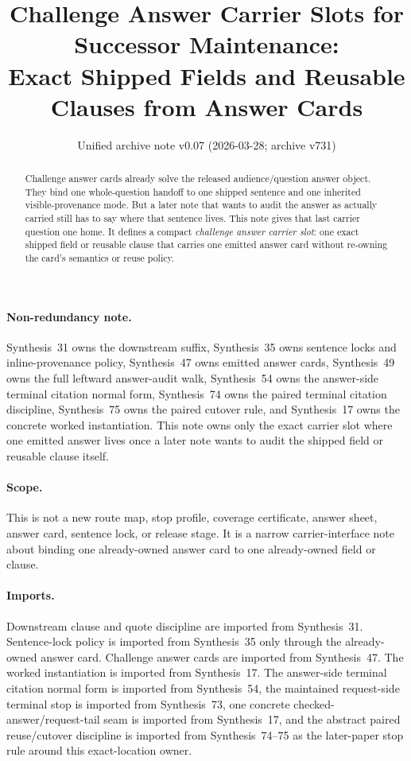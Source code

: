 \documentclass[11pt]{article}
\title{Challenge Answer Carrier Slots for Successor Maintenance:\\[0.5ex]
\large Exact Shipped Fields and Reusable Clauses from Answer Cards}
\author{}
\date{Unified archive note v0.07 (2026-03-28; archive v731)}
\begin{document}
\maketitle

\begin{abstract}
Challenge answer cards already solve the released audience/question answer object.
They bind one whole-question handoff to one shipped sentence and one inherited visible-provenance mode.
But a later note that wants to audit the answer as actually carried still has to say where that sentence lives.
This note gives that last carrier question one home.
It defines a compact \emph{challenge answer carrier slot}: one exact shipped field or reusable clause that carries one emitted answer card without re-owning the card's semantics or reuse policy.
\end{abstract}

\paragraph{Non-redundancy note.}
Synthesis~31 owns the downstream suffix, Synthesis~35 owns sentence locks and inline-provenance policy, Synthesis~47 owns emitted answer cards, Synthesis~49 owns the full leftward answer-audit walk, Synthesis~54 owns the answer-side terminal citation normal form, Synthesis~74 owns the paired terminal citation discipline, Synthesis~75 owns the paired cutover rule, and Synthesis~17 owns the concrete worked instantiation.
This note owns only the exact carrier slot where one emitted answer lives once a later note wants to audit the shipped field or reusable clause itself.

\paragraph{Scope.}
This is not a new route map, stop profile, coverage certificate, answer sheet, answer card, sentence lock, or release stage.
It is a narrow carrier-interface note about binding one already-owned answer card to one already-owned field or clause.

\paragraph{Imports.}
Downstream clause and quote discipline are imported from Synthesis~31.\cite{series:downstreamnormalforms}
Sentence-lock policy is imported from Synthesis~35 only through the already-owned answer card.\cite{series:sentencelocks}
Challenge answer cards are imported from Synthesis~47.\cite{series:challengeanswercards}
The worked instantiation is imported from Synthesis~17.\cite{series:workedexample}
The answer-side terminal citation normal form is imported from Synthesis~54, the maintained request-side terminal stop is imported from Synthesis~73, one concrete checked-answer/request-tail seam is imported from Synthesis~17, and the abstract paired reuse/cutover discipline is imported from Synthesis~74--75 as the later-paper stop rule around this exact-location owner.\cite{series:challengeanswerreviewmenus,series:workedexample,series:pairedterminalcitationdiscipline,series:pairedterminalcutoverrules}
\end{document}
